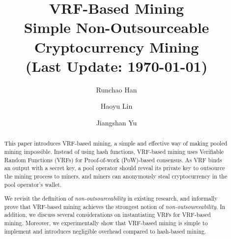 \documentclass[runningheads]{llncs}
\begin{document}
\title{
  VRF-Based Mining\\
  \large Simple Non-Outsourceable Cryptocurrency Mining\\
  \vspace*{5pt} \large  (Last Update: \today{})
}


\author{%
Runchao Han  \and 
Haoyu Lin \and
Jiangshan Yu
}%

\maketitle

\begin{abstract}
  This paper introduces VRF-based mining, a simple and effective way of making pooled mining impossible.
  Instead of using hash functions, VRF-based mining uses Verifiable Random Functions (VRFs) for Proof-of-work (PoW)-based consensus.
  As VRF binds an output with a secret key, a pool operator should reveal its private key to outsource the mining process to miners, and miners can anonymously steal cryptocurrency in the pool operator's wallet.
  
  We revisit the definition of \emph{non-outsourceability} in existing research, and informally prove that VRF-based mining achieves the strongest notion of \emph{non-outsourceability}.
  In addition, we discuss several considerations on instantiating VRFs for VRF-based mining.
  Moreover, we experimentally show that VRF-based mining is simple to implement and introduces negligible overhead compared to hash-based mining.
\end{abstract}















\appendix

\end{document}

